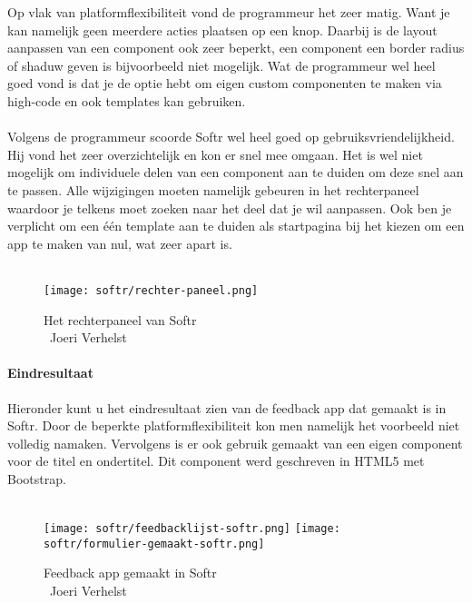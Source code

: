 Op vlak van platformflexibiliteit vond de programmeur het zeer matig. 
Want je kan namelijk geen meerdere acties plaatsen op een knop. 
Daarbij is de layout aanpassen van een component ook zeer beperkt, een component een border radius of shaduw geven is bijvoorbeeld niet mogelijk. 
Wat de programmeur wel heel goed vond is dat je de optie hebt om eigen custom componenten te maken via high-code en ook templates kan gebruiken.
\\
\\
Volgens de programmeur scoorde Softr wel heel goed op gebruiksvriendelijkheid. 
Hij vond het zeer overzichtelijk en kon er snel mee omgaan. 
Het is wel niet mogelijk om individuele delen van een component aan te duiden om deze snel aan te passen. 
Alle wijzigingen moeten namelijk gebeuren in het rechterpaneel waardoor je telkens moet zoeken naar het deel dat je wil aanpassen. 
Ook ben je verplicht om een één template aan te duiden als startpagina bij het kiezen om een app te maken van nul, wat zeer apart is. 
\\
\\
\begin{figure}[H]
    \texttt{[image: softr/rechter-paneel.png]}
    \caption[Het rechterpaneel van Softr]{Het rechterpaneel van Softr\\\textcopyright\ Joeri Verhelst}
    \label{fig:softr-rechterpaneel}
\end{figure}
\paragraph*{Eindresultaat}
Hieronder kunt u het eindresultaat zien van de feedback app dat gemaakt is in Softr. Door de beperkte platformflexibiliteit kon men namelijk het voorbeeld niet volledig namaken. 
Vervolgens is er ook gebruik gemaakt van een eigen component voor de titel en ondertitel. Dit component werd geschreven in HTML5 met Bootstrap.
\\
\\

\begin{figure}[H]
    \texttt{[image: softr/feedbacklijst-softr.png]}
    \texttt{[image: softr/formulier-gemaakt-softr.png]}
    \caption[Feedback app gemaakt in Softr]{Feedback app gemaakt in Softr\\\textcopyright\ Joeri Verhelst}
    \label{fig:softr-feedback-app}
\end{figure}


